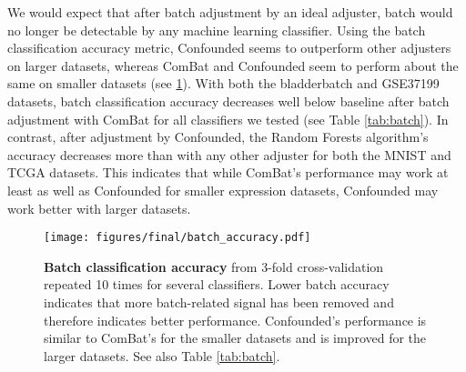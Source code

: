 We would expect that after batch adjustment by an ideal adjuster, batch would no longer be detectable by any machine learning classifier.
Using the batch classification accuracy metric, Confounded seems to outperform other adjusters on larger datasets, whereas ComBat and Confounded seem to perform about the same on smaller datasets (see \figurename{} \ref{fig:batch}).
With both the bladderbatch and GSE37199 datasets, batch classification accuracy decreases well below baseline after batch adjustment with ComBat for all classifiers we tested (see Table \ref{tab:batch}).
In contrast, after adjustment by Confounded, the Random Forests algorithm's accuracy decreases more than with any other adjuster for both the MNIST and TCGA datasets.
This indicates that while ComBat's performance may work at least as well as Confounded for smaller expression datasets, Confounded may work better with larger datasets.

\begin{figure}
	\centering
	\texttt{[image: figures/final/batch\_accuracy.pdf]}
	\caption[Batch classification accuracy]{\textbf{Batch classification accuracy} from 3-fold cross-validation repeated 10 times for several classifiers.
	Lower batch accuracy indicates that more batch-related signal has been removed and therefore indicates better performance.
	Confounded's performance is similar to ComBat's for the smaller datasets and is improved for the larger datasets.
	See also Table \ref{tab:batch}.}
	\label{fig:batch}
\end{figure}
\begin{table}
	\centering
	
	\caption[Batch classification accuracy]{
		\textbf{Batch classification accuracy} for several datasets and adjusters.
		The ideal batch adjuster would completely remove all signal due to batch and would therefore \textit{decrease} batch classification accuracy to around the baseline for all classifiers.
		See also \figurename{} \ref{fig:batch}.
	}
	\label{tab:batch}
\end{table}

